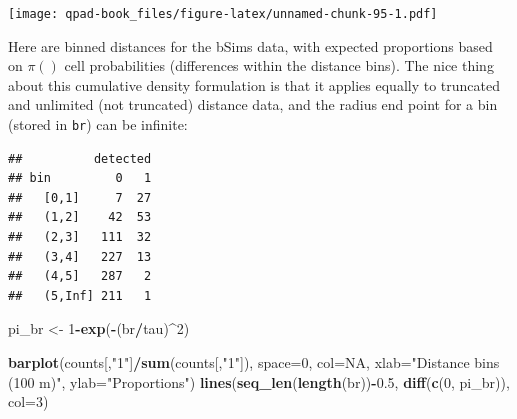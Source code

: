 \documentclass[12pt,]{book}
\newenvironment{Shaded}{\begin{snugshade}}{\end{snugshade}}
\newcommand{\DataTypeTok}[1]{\textcolor[rgb]{0.13,0.29,0.53}{#1}}
\newcommand{\DecValTok}[1]{\textcolor[rgb]{0.00,0.00,0.81}{#1}}
\newcommand{\FloatTok}[1]{\textcolor[rgb]{0.00,0.00,0.81}{#1}}
\newcommand{\KeywordTok}[1]{\textcolor[rgb]{0.13,0.29,0.53}{\textbf{#1}}}
\newcommand{\NormalTok}[1]{#1}
\newcommand{\OperatorTok}[1]{\textcolor[rgb]{0.81,0.36,0.00}{\textbf{#1}}}
\newcommand{\OtherTok}[1]{\textcolor[rgb]{0.56,0.35,0.01}{#1}}
\newcommand{\StringTok}[1]{\textcolor[rgb]{0.31,0.60,0.02}{#1}}
\begin{document}
\texttt{[image: qpad-book\_files/figure-latex/unnamed-chunk-95-1.pdf]}

Here are binned distances for the bSims data, with expected
proportions based on \(\pi()\) cell probabilities
(differences within the distance bins).
The nice thing about this cumulative density formulation
is that it applies equally to truncated and unlimited
(not truncated) distance data, and the radius end point
for a bin (stored in \texttt{br}) can be infinite:

\begin{Shaded}
\end{Shaded}

\begin{verbatim}
##          detected
## bin         0   1
##   [0,1]     7  27
##   (1,2]    42  53
##   (2,3]   111  32
##   (3,4]   227  13
##   (4,5]   287   2
##   (5,Inf] 211   1
\end{verbatim}

\begin{Shaded}
\begin{Highlighting}[]
\NormalTok{pi_br <-}\StringTok{ }\DecValTok{1}\OperatorTok{-}\KeywordTok{exp}\NormalTok{(}\OperatorTok{-}\NormalTok{(br}\OperatorTok{/}\NormalTok{tau)}\OperatorTok{^}\DecValTok{2}\NormalTok{)}

\KeywordTok{barplot}\NormalTok{(counts[,}\StringTok{"1"}\NormalTok{]}\OperatorTok{/}\KeywordTok{sum}\NormalTok{(counts[,}\StringTok{"1"}\NormalTok{]), }\DataTypeTok{space=}\DecValTok{0}\NormalTok{, }\DataTypeTok{col=}\OtherTok{NA}\NormalTok{,}
  \DataTypeTok{xlab=}\StringTok{"Distance bins (100 m)"}\NormalTok{, }\DataTypeTok{ylab=}\StringTok{"Proportions"}\NormalTok{)}
\KeywordTok{lines}\NormalTok{(}\KeywordTok{seq_len}\NormalTok{(}\KeywordTok{length}\NormalTok{(br))}\OperatorTok{-}\FloatTok{0.5}\NormalTok{, }\KeywordTok{diff}\NormalTok{(}\KeywordTok{c}\NormalTok{(}\DecValTok{0}\NormalTok{, pi_br)), }\DataTypeTok{col=}\DecValTok{3}\NormalTok{)}
\end{Highlighting}
\end{Shaded}
\end{document}
